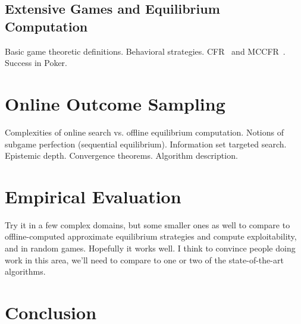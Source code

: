 \documentclass[letterpaper]{article}
\begin{document}
\subsection{Extensive Games and Equilibrium Computation}

Basic game theoretic definitions. Behavioral strategies. 
CFR~\cite{CFR} and MCCFR~\cite{Lanctot09Sampling}. Success in Poker.

\section{Online Outcome Sampling}

Complexities of online search vs. offline equilibrium computation. Notions of subgame perfection (sequential equilibrium). Information set targeted search. Epistemic depth.
Convergence theorems. Algorithm description.

\section{Empirical Evaluation}

Try it in a few complex domains, but some smaller ones as well to compare to offline-computed approximate equilibrium strategies and compute exploitability, and in random games. 
Hopefully it works well. I think to convince people doing work in this area, we'll need 
to compare to one or two of the state-of-the-art algorithms. 

\section{Conclusion}



\end{document}
